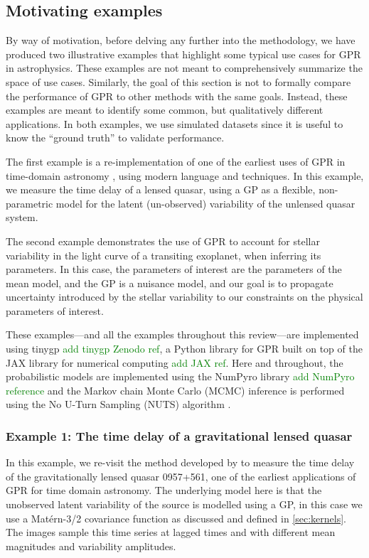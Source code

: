 \documentclass[letterpaper]{ar-1col}
\newcommand{\dan}[1]{\textcolor{green}{#1}}
\begin{document}
\subsection{Motivating examples}
\label{sec:sim_examples}

By way of motivation, before delving any further into the methodology, we have produced two illustrative examples that highlight some typical use cases for GPR in astrophysics.
These examples are not meant to comprehensively summarize the space of use cases.
Similarly, the goal of this section is not to formally compare the performance of GPR to other methods with the same goals.
Instead, these examples are meant to identify some common, but qualitatively different applications.
In both examples, we use simulated datasets since it is useful to know the ``ground truth'' to validate performance.

The first example is a re-implementation of one of the earliest uses of GPR in time-domain astronomy \citep{prh92a}, using modern language and techniques.
In this example, we measure the time delay of a lensed quasar, using a GP as a flexible, non-parametric model for the latent (un-observed) variability of the unlensed quasar system.

The second example demonstrates the use of GPR to account for stellar variability in the light curve of a transiting exoplanet, when inferring its parameters.
In this case, the parameters of interest are the parameters of the mean model, and the GP is a nuisance model, and our goal is to propagate uncertainty introduced by the stellar variability to our constraints on the physical parameters of interest.

These examples---and all the examples throughout this review---are implemented using \textsf{tinygp} \dan{add tinygp Zenodo ref}, a \textsf{Python} library for GPR built on top of the \textsf{JAX} library for numerical computing \dan{add JAX ref}.
Here and throughout, the probabilistic models are implemented using the \textsf{NumPyro} library \dan{add NumPyro reference} and the Markov chain Monte Carlo (MCMC) inference is performed using the No U-Turn Sampling (NUTS) algorithm \citep{Hoffman:2014}.

\subsubsection{Example 1: The time delay of a gravitational lensed quasar}
\label{sec:quasar}

In this example, we re-visit the method developed by \citet{prh92a} to measure the time delay of the gravitationally lensed quasar 0957+561, one of the earliest applications of GPR for time domain astronomy.
The underlying model here is that the unobserved latent variability of the source is modelled using a GP, in this case we use a Mat\'ern-3/2 covariance function as discussed and defined in \autoref{sec:kernels}.
The images sample this time series at lagged times and with different mean magnitudes and variability amplitudes.
\end{document}
